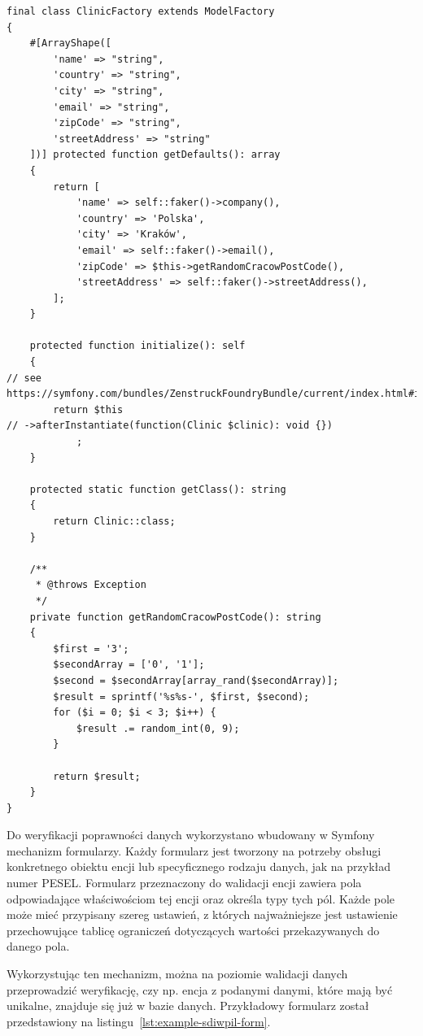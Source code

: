 \documentclass[12pt,oneside]{book}
\begin{document}
\begin{lstlisting}[caption={Przykładowa fabryka danych testowych w Symfony}, label={lst:example-sdiwpil-fixtures-factory}]
final class ClinicFactory extends ModelFactory
{
    #[ArrayShape([
        'name' => "string",
        'country' => "string",
        'city' => "string",
        'email' => "string",
        'zipCode' => "string",
        'streetAddress' => "string"
    ])] protected function getDefaults(): array
    {
        return [
            'name' => self::faker()->company(),
            'country' => 'Polska',
            'city' => 'Kraków',
            'email' => self::faker()->email(),
            'zipCode' => $this->getRandomCracowPostCode(),
            'streetAddress' => self::faker()->streetAddress(),
        ];
    }

    protected function initialize(): self
    {
// see https://symfony.com/bundles/ZenstruckFoundryBundle/current/index.html#initialization
        return $this
// ->afterInstantiate(function(Clinic $clinic): void {})
            ;
    }

    protected static function getClass(): string
    {
        return Clinic::class;
    }

    /**
     * @throws Exception
     */
    private function getRandomCracowPostCode(): string
    {
        $first = '3';
        $secondArray = ['0', '1'];
        $second = $secondArray[array_rand($secondArray)];
        $result = sprintf('%s%s-', $first, $second);
        for ($i = 0; $i < 3; $i++) {
            $result .= random_int(0, 9);
        }

        return $result;
    }
}
\end{lstlisting}

    Do weryfikacji poprawności danych wykorzystano wbudowany w Symfony mechanizm formularzy. Każdy formularz jest tworzony na potrzeby obsługi konkretnego obiektu encji lub specyficznego rodzaju danych, jak na przykład numer PESEL. Formularz przeznaczony do walidacji encji zawiera pola odpowiadające właściwościom tej encji oraz określa typy tych pól. Każde pole może mieć przypisany szereg ustawień, z których najważniejsze jest ustawienie przechowujące tablicę ograniczeń dotyczących wartości przekazywanych do danego pola.

    Wykorzystując ten mechanizm, można na poziomie walidacji danych przeprowadzić weryfikację, czy np. encja z podanymi danymi, które mają być unikalne, znajduje się już w bazie danych. Przykładowy formularz został przedstawiony na listingu~\ref{lst:example-sdiwpil-form}.
\end{document}
